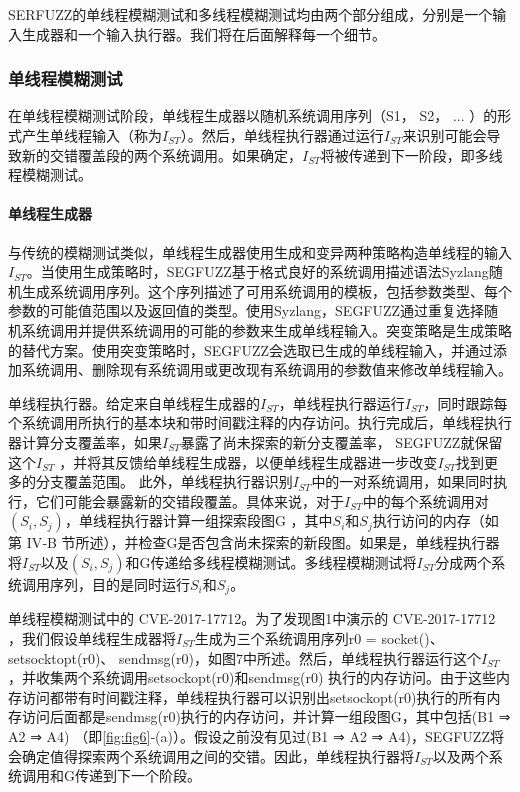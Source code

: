 SERFUZZ的单线程模糊测试和多线程模糊测试均由两个部分组成，分别是一个输入生成器和一个输入执行器。我们将在后面解释每一个细节。

\subsubsection{单线程模糊测试}

在单线程模糊测试阶段，单线程生成器以随机系统调用序列（S1， S2， ... ）的形式产生单线程输入（称为$I_{ST}$）。然后，单线程执行器通过运行$I_{ST}$来识别可能会导致新的交错覆盖段的两个系统调用。如果确定，$I_{ST}$将被传递到下一阶段，即多线程模糊测试。

\paragraph{单线程生成器}与传统的模糊测试类似，单线程生成器使用生成和变异两种策略构造单线程的输入$I_{ST}$。当使用生成策略时，SEGFUZZ基于格式良好的系统调用描述语法Syzlang随机生成系统调用序列。这个序列描述了可用系统调用的模板，包括参数类型、每个参数的可能值范围以及返回值的类型。使用Syzlang，SEGFUZZ通过重复选择随机系统调用并提供系统调用的可能的参数来生成单线程输入。突变策略是生成策略的替代方案。使用突变策略时，SEGFUZZ会选取已生成的单线程输入，并通过添加系统调用、删除现有系统调用或更改现有系统调用的参数值来修改单线程输入。

单线程执行器。给定来自单线程生成器的$I_{ST}$，单线程执行器运行$I_{ST}$，同时跟踪每个系统调用所执行的基本块和带时间戳注释的内存访问。执行完成后，单线程执行器计算分支覆盖率，如果$I_{ST}$暴露了尚未探索的新分支覆盖率， SEGFUZZ就保留这个$I_{ST}$ ，并将其反馈给单线程生成器，以便单线程生成器进一步改变$I_{ST}$找到更多的分支覆盖范围。
此外，单线程执行器识别$I_{ST}$中的一对系统调用，如果同时执行，它们可能会暴露新的交错段覆盖。具体来说，对于$I_{ST}$中的每个系统调用对$(S_i , S_j)$，单线程执行器计算一组探索段图G ，其中$S_i$和$S_j$执行访问的内存（如第 IV‑B 节所述），并检查G是否包含尚未探索的新段图。如果是，单线程执行器将$I_{ST}$以及$(S_i , S_j)$和G传递给多线程模糊测试。多线程模糊测试将$I_{ST}$分成两个系统调用序列，目的是同时运行$S_i$和$S_j$。

单线程模糊测试中的 CVE-2017-17712。为了发现图1中演示的 CVE-2017-17712 ，我们假设单线程生成器将$I_{ST}$生成为三个系统调用序列r0 = socket()、setsocktopt(r0)、 sendmsg(r0)，如图7中所述。然后，单线程执行器运行这个$I_{ST}$ ，并收集两个系统调用setsockopt(r0)和sendmsg(r0) 执行的内存访问。由于这些内存访问都带有时间戳注释，单线程执行器可以识别出setsockopt(r0)执行的所有内存访问后面都是sendmsg(r0)执行的内存访问，并计算一组段图G，其中包括(B1 ⇒ A2 ⇒ A4) （即\autoref{fig:fig6}‑(a)）。假设之前没有见过(B1 ⇒ A2 ⇒ A4)，SEGFUZZ将会确定值得探索两个系统调用之间的交错。因此，单线程执行器将$I_{ST}$以及两个系统调用和G传递到下一个阶段。


